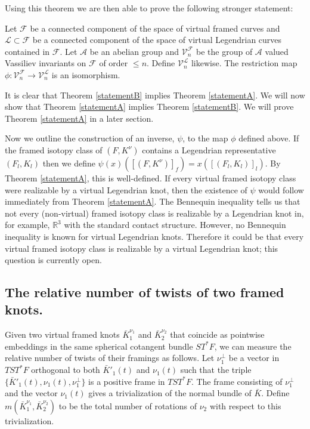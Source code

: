 Using this theorem we are then able to prove the following stronger statement:

\begin{thm} \label{statementB}
Let $\mathcal{F}$ be a connected component of the space of virtual framed curves and $\mathcal{L}\subset\mathcal{F}$ be a connected component of the space of virtual Legendrian curves contained in $\mathcal{F}$.  Let $\mathcal{A}$ be an abelian group and $\mathcal{V}_n^\mathcal{F}$ be the group of $\mathcal{A}$ valued Vassiliev invariants on $\mathcal{F}$ of order $\leq n$.  Define $\mathcal{V}_n^\mathcal{L}$ likewise.  The restriction map $\phi:\mathcal{V}_n^{\mathcal{F}}\rightarrow\mathcal{V}_n^\mathcal{L}$ is an isomorphism.
\end{thm}




It is clear that Theorem \ref{statementB} implies Theorem \ref{statementA}.  We will now show that Theorem \ref{statementA} implies Theorem \ref{statementB}.  We will prove Theorem \ref{statementA} in a later section.


Now we outline the construction of an inverse, $\psi$, to the map $\phi$ defined above.  If the framed isotopy class of $(F,K^\nu)$ contains a Legendrian representative $(F_l,K_l)$ then we define $\psi(x)([(F,K^\nu)]_f)=x([(F_l,K_l)]_l)$.  By Theorem \ref{statementA}, this is well-defined. If every virtual framed isotopy class were realizable by a virtual Legendrian knot, then the existence of $\psi$ would follow immediately from Theorem \ref{statementA}.  The Bennequin inequality tells us that not every (non-virtual) framed isotopy class is realizable by a Legendrian knot in, for example, $\mathbb{R}^3$ with the standard contact structure.  However, no Bennequin inequality is known for virtual Legendrian knots.  Therefore it could be that every virtual framed isotopy class is realizable by a virtual Legendrian knot; this question is currently open.






\subsection{The relative number of twists of two framed knots.} \label{mdefn} Given two virtual framed knots $\bar{K}_1^{\nu_1}$ and $\bar{K}_2^{\nu_2}$ that coincide as pointwise embeddings in the same spherical cotangent bundle $ST^*F$, we can measure the relative number of twists of their framings as follows.  Let $\nu^{\perp}_1$ be a vector in $TST^*F$ orthogonal to both $\bar{K}'_1(t)$ and $\nu_1(t)$ such that the triple $\{\bar{K}'_1(t),\nu_1(t),\nu^{\perp}_1\}$ is a positive frame in $TST^*F$.  The frame consisting of $\nu^{\perp}_1$ and the vector ${\nu_1}(t)$ gives a trivialization of the normal bundle of $\bar{K}$.  Define $m(\bar{K}_1^{\nu_1},\bar{K}_2^{\nu_2})$ to be the total number of rotations of $\nu_2$ with respect to this trivialization.



